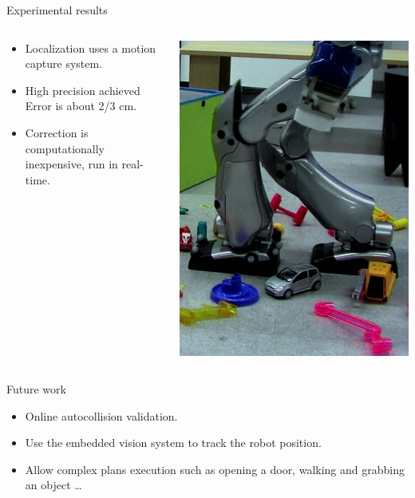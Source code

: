 \documentclass[hyperref={pdfpagelabels=false}]{beamer}
\begin{document}
\begin{frame}{Experimental results}
  \begin{columns}[c]
    \begin{column}{0.5\textwidth}
      \begin{itemize}
      \item Localization uses a motion capture system.
      \item High precision achieved\\
        Error is about 2/3 cm.\\
      \item Correction is computationally inexpensive, run in
        real-time.
      \end{itemize}
    \end{column}

    \begin{column}{0.5\textwidth}
      \includegraphics[width=0.9\linewidth]{fig/exp2.jpg}
    \end{column}
  \end{columns}
\end{frame}

\begin{frame}{Future work}
  \begin{itemize}
    \item Online autocollision validation.\\
      {
        \footnotesize
        \cite{10icra.perrin}
      }
    \item Use the embedded vision system to track the robot position.
    \item Allow complex plans execution such as opening a door,
      walking and grabbing an object \ldots

  \end{itemize}
\end{frame}
\end{document}
